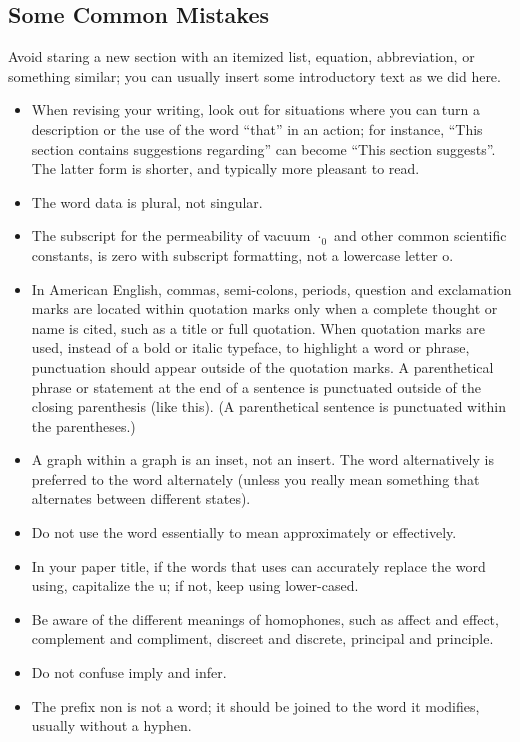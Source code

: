 \documentclass[letterpaper, 10 pt, conference]{ieeeconf}
\begin{document}
\subsection{Some Common Mistakes}\label{sec:mistakes}
Avoid staring a new section with an itemized list, equation, abbreviation, or something similar; you can usually insert some introductory text as we did here.
\begin{itemize}
\item When revising your writing, look out for situations where you can turn a description or the use of the word ``that'' in an action; for instance, ``This section contains suggestions regarding'' can become ``This section suggests''. %
  The latter form is shorter, and typically more pleasant to read.
\item The word data is plural, not singular.
\item The subscript for the permeability of vacuum $\cdot_0$ and other common scientific constants, is zero with subscript formatting, not a lowercase letter o.
\item In American English, commas, semi-colons, periods, question and exclamation marks are located within quotation marks only when a complete thought or name is cited, such as a title or full quotation. When quotation marks are used, instead of a bold or italic typeface, to highlight a word or phrase, punctuation should appear outside of the quotation marks. A parenthetical phrase or statement at the end of a sentence is punctuated outside of the closing parenthesis (like this). (A parenthetical sentence is punctuated within the parentheses.)
\item A graph within a graph is an inset, not an insert. The word alternatively is preferred to the word alternately (unless you really mean something that alternates between different states).
\item Do not use the word essentially to mean approximately or effectively.
\item In your paper title, if the words that uses can accurately replace the word using, capitalize the u; if not, keep using lower-cased.
\item Be aware of the different meanings of homophones, such as affect and effect, complement and compliment, discreet and discrete, principal and principle.
\item Do not confuse imply and infer.
\item The prefix non is not a word; it should be joined to the word it modifies, usually without a hyphen.

\end{itemize}
\end{document}

